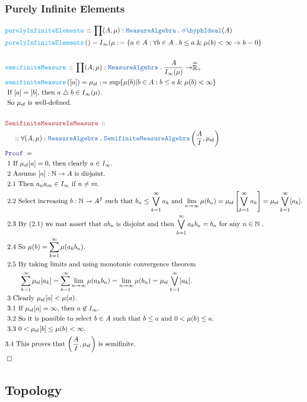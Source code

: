 \documentclass[12pt]{scrartcl}
\newcommand{\TYPE}[1]{\textcolor{NavyBlue}{\mathtt{#1}}}
\newcommand{\FUNC}[1]{\textcolor{Cerulean}{\mathtt{#1}}}
\newcommand{\LOGIC}[1]{\textcolor{Blue}{\mathtt{#1}}}
\newcommand{\THM}[1]{\textcolor{Maroon}{\mathtt{#1}}}
\renewcommand{\.}{\; . \;}
\newcommand{\de}{: \kern 0.1pc =}
\newcommand{\Act}[1]{\left( #1 \right)}
\newcommand{\Theorem}[2]{& \THM{#1} \, :: \, #2 \\ & \Proof = \\ }
\newcommand{\DeclareFunc}[2]{& \FUNC{#1} \, :: \, #2 \\}
\newcommand{\DefineNamedFunc}[4]{&  \FUNC{#1}\Act{#2} = #3 \de #4 \\}
\newcommand{\NewLine}{\\ & \kern 1pc}
\newcommand{\Page}[1]{ \begin{align*} #1 \end{align*}   }
\renewcommand{\And}{\; \& \;}
\newcommand{\Imply}{\Rightarrow}
\newcommand{\Nat}{\mathbb{N} }
\newcommand{\EReals}{\stackrel{\mathclap{\infty}}{\mathbb{R}}}
\newcommand{\du}{\; \triangle \;}
\newcommand{\QED}{\; \square}
\newcommand{\EndProof}{& \QED \\}
\newcommand{\Proof}{\LOGIC{Proof} \; }
\newcommand{\Explain}[1]{& \text{#1.} \\}
\newcommand{\ExplainFurther}[1]{& \text{#1} \\}
\newcommand{\Ideal}{\TYPE{Ideal}}
\newcommand{\SIdeal}{\TYPE{\sigma\hyph \Ideal}}
\newcommand{\Semifinite}{\TYPE{Semifinite}}
\newcommand{\MA}{\TYPE{MeasureAlgebra}}
\begin{document}
\subsubsection{Purely Infinite Elements}
\Page{
	\DeclareFunc{purelyInfiniteElements}
	{
		\prod (A,\mu) : \MA \. \SIdeal(A)
	}
	\DefineNamedFunc{purelyInfiniteElements}{}{I_\infty(\mu}
	{
		\{ a \in A : \forall b  \in A \. b \le a \And \mu(b) < \infty \Imply b = 0  \}
	}
	\\
	\DeclareFunc{semifiniteMeasure}{\prod (A,\mu) : \MA \. \frac{A}{I_\infty(\mu)} \to \EReals_+}
	\DefineNamedFunc{semifiniteMeasure}{[a]}{\mu_{\mathrm{sf}}}
	{\sup \{ \mu(b) | b \in A : b \le a \And \mu(b) < \infty\}}
	\Explain{ If $[a] = [b]$, then $a \du b \in I_\infty(\mu)$}
	\Explain{ So $\mu_{\mathrm{sf}}$ is well-defined} 
	\\
	\Theorem{SemifiniteMeasureIsMeasure}
	{
		\NewLine ::		
		\forall (A,\mu) : \MA \. \Semifinite\MA\left( \frac{A}{I}, \mu_{\mathrm{sf}} \right)	
	}
	\Explain{ 1 If $\mu_{\mathrm{sf}}[a] = 0$, then clearly $a \in I_\infty$}
	\Explain{ 2 Assume $[a] : \Nat \to A$ is disjoint}
	\Explain{ 2.1 Then $a_n a_m \in I_\infty$  if $n \neq m$}
	\Explain{ 2.2 Select increasing $b : \Nat \to A^f$ such that $b_n \le \bigvee^\infty_{k=1} a_k$
		and $\lim_{n \to \infty} \mu(b_n) = \mu_{\mathrm{sf}} \left[\bigvee^\infty_{k=1} a_k  \right] 
			= \mu_{\mathrm{sf}} \bigvee^\infty_{k=1} [a_k]$}
	\Explain{ 2.3  By (2.1) we mat assert that $ab_n$ is disjoint and then $\bigvee^\infty_{k=1} a_kb_n = b_n$
	 for any $n \in \Nat$ }
	\Explain{ 2.4 So $\mu(b) = \sum^\infty_{k=1}  \mu(a_k b_n) $}
	\ExplainFurther{ 2.5 By taking limits and using monotonic convergence theorem} 
	\Explain{ $\quad \quad \sum^\infty_{k=1} \mu_{\mathrm{sf}}[a_k] = 
		\sum^\infty_{k=1}  \lim_{n \to \infty} \mu(a_k b_n) = 
		\lim_{n \to \infty} \mu(b_n) = 
		\mu_{\mathrm{sf}} \bigvee^\infty_{k=1} [a_k]$}	
	\Explain{ 3 Clearly  $\mu_{\mathrm{sf}}[a] < \mu(a)$}	
	\Explain{ 3.1 If $\mu_{\mathrm{sf}}[a] = \infty$, then $a \not \in I_\infty$}
	\Explain{ 3.2 So it is possible to select $b \in A$ such that $b \le a$ and $0 < \mu(b) \le a$}
	\Explain{ 3.3 $0 < \mu_{\mathrm{sf}}[b] \le \mu(b) < \infty$}
	\Explain{3.4 This proves that $\left( \frac{A}{I}, \mu_{\mathrm{sf}} \right)$ is semifinite}
	\EndProof
}
\newpage
\subsection{Topology}
\end{document}
